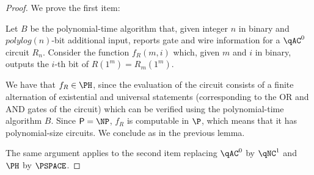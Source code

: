 \begin{proof}
	We prove the first item:

	Let $B$ be the polynomial-time algorithm that, given integer $n$
	in binary and $polylog(n)$-bit additional input, reports gate and wire information
	for a $\qAC^0$ circuit $R_n$. Consider the function $f_R(m, i)$ which, 
	given $m$ and $i$ in binary, outputs the $i$-th bit of $R(1^m) = R_m(1^m)$.

	We have that $f_R \in \PH$, since the evaluation of the circuit consists 
	of a finite alternation of existential and universal statements (corresponding to the 
	OR and AND gates of the circuit) which can be verified using the polynomial-time
	algorithm $B$. Since $\PTIME = \NP$, $f_R$ is computable in $\P$, which means that it has 
	polynomial-size circuits. We conclude as in the previous lemma. 

	The same argument applies to the second item replacing $\qAC^0$ by $\qNC^1$ and $\PH$ by $\PSPACE$. 
\end{proof}

